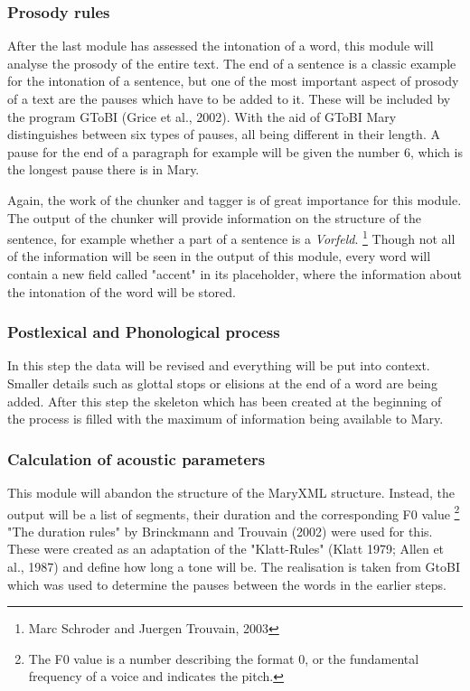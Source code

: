 \documentclass[a4paper, 12pt]{article}
\begin{document}
\subsubsection*{Prosody rules}

After the last module has assessed the intonation of a word, this module will analyse the prosody of the entire text.
The end of a sentence is a classic example for the intonation of a sentence, but one of the most important aspect of prosody of a text are the pauses which have to be added to it.
These will be included by the program GToBI (Grice et al., 2002). 
With the aid of GToBI Mary distinguishes between six types of pauses, all being different in their length.
A pause for the end of a paragraph for example will be given the number 6, which is the longest pause there is in Mary.

Again, the work of the chunker and tagger is of great importance for this module.
The output of the chunker will provide information on the structure of the sentence, for example whether a part of a sentence is a \emph{Vorfeld}. \footnote {Marc Schroder and Juergen Trouvain, 2003}
Though not all of the information will be seen in the output of this module, every word will contain a new field called "accent" in its placeholder, where the information about the intonation of the word will be stored.

\subsubsection*{Postlexical and Phonological process}

In this step the data will be revised and everything will be put into context.
Smaller details such as glottal stops or elisions at the end of a word are being added. 
After this step the skeleton which has been created at the beginning of the process is filled with the maximum of information being available to Mary.

\subsubsection*{Calculation of acoustic parameters} 

This module will abandon the structure of the MaryXML structure.
Instead, the output will be a list of segments, their duration and the corresponding F0 value \footnote {The F0 value is a number describing the format 0, or the fundamental frequency of a voice and indicates the pitch.}
"The duration rules" by Brinckmann and Trouvain (2002) were used for this. These were created as an adaptation of the  "Klatt-Rules" (Klatt 1979; Allen et al., 1987) and define how long a tone will be.
The realisation is taken from GtoBI which was used to determine the pauses between the words in the earlier steps.
\end{document}
